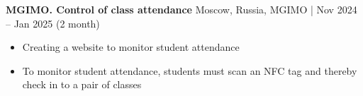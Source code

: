 \textbf{MGIMO. Control of class attendance} \hfill Moscow, Russia, MGIMO | Nov 2024 – Jan 2025 (2 month)
\begin{itemize}[noitemsep, topsep=0pt, partopsep=0pt, parsep=0pt]
    \item Creating a website to monitor student attendance
    \item To monitor student attendance, students must scan an NFC tag and thereby check in to a pair of classes
\end{itemize}